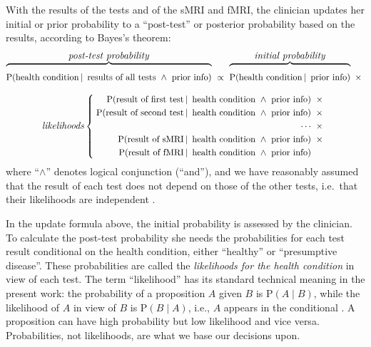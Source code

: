 \documentclass[%
]{frontiersSCNS-nologo} %
\newcommand*{\sect}{\S} %
\newcommand*{\ie}{i.e.}
\newcommand*{\zerob}[1]{\makebox[0pt][c]{#1}}
\newcommand*{\p}{\mathrm{P}}%
\renewcommand*{\|}{\mathpunct{|}}%
\newcommand*{\Land}{\mathbin{\ \land\ }}
\newcommand*{\Cond}{\mathpunct{\,|\ }}%
\begin{document}
With the results of the tests and of the sMRI and fMRI, the clinician
updates her initial or prior probability to a \enquote{post-test} or
posterior probability based on the results, according to Bayes's theorem:
\begin{multline}\label{eq:bayes_theorem_intro}
    \overbrace{\vphantom{\bigg\{}\p(\text{health condition}\Cond
      \text{results of all tests}\Land
      \text{prior info})}^{\zerob{\scriptsize\emph{post-test probability}}}
    \mathrel{\ \propto\ }
    \overbrace{\vphantom{\bigg\{}\p(\text{health condition} \Cond
      \text{prior info})}^{\zerob{\scriptsize\emph{initial probability}}}
  \mathbin{\ \times\ }{}    
    \\[\jot]
\text{\scriptsize\emph{likelihoods}}\left\{\;  \begin{aligned}
 \p(\text{result of first test} \Cond \text{health condition} \Land
  \text{prior info})
  &\mathbin{\ \times\ }{}\\
  \p(\text{result of second test} \Cond \text{health condition} \Land
  \text{prior info})
  &\mathbin{\ \times\ }{}
\\
{}\dotsb &\mathbin{\ \times\ }{}\\
 \p(\text{result of sMRI} \Cond \text{health condition} \Land
   \text{prior info})&
 \mathbin{\ \times\ }{}\\
 \p(\text{result of fMRI} \Cond \text{health condition} \Land
  \text{prior info})&
  \end{aligned}\right.
\end{multline}
where \enquote{$\land$} denotes logical conjunction (\enquote{and}), and we
have reasonably assumed that the result of each test does not depend on
those of the other tests, \ie\ that their likelihoods are independent
\citetext{\citealp[\sect~4.2]{jaynes1994_r2003};
  \citealp[\sect~4.7]{soxetal1988_r2013}}.

In the update formula above, the initial probability is assessed by the
clinician. To calculate the post-test probability she needs the
probabilities for each test result conditional on the health condition,
either \enquote{healthy} or \enquote{presumptive disease}. These probabilities
are called the \emph{likelihoods for the health condition} in view of each
test. The term \enquote{likelihood} has its standard technical meaning in
the present work: the probability of a proposition $A$ given $B$ is
$\p(A\|B)$, while the likelihood of $A$ in view of $B$ is $\p(B\|A)$, \ie,
$A$ appears in the conditional
\citetext{\citealp[\sect~4.1]{jaynes1994_r2003};
  \citealp[\sect~6.1]{good1950}}. A proposition can have high probability
but low likelihood and vice versa. Probabilities, not likelihoods, are what
we base our decisions upon.
\end{document}
